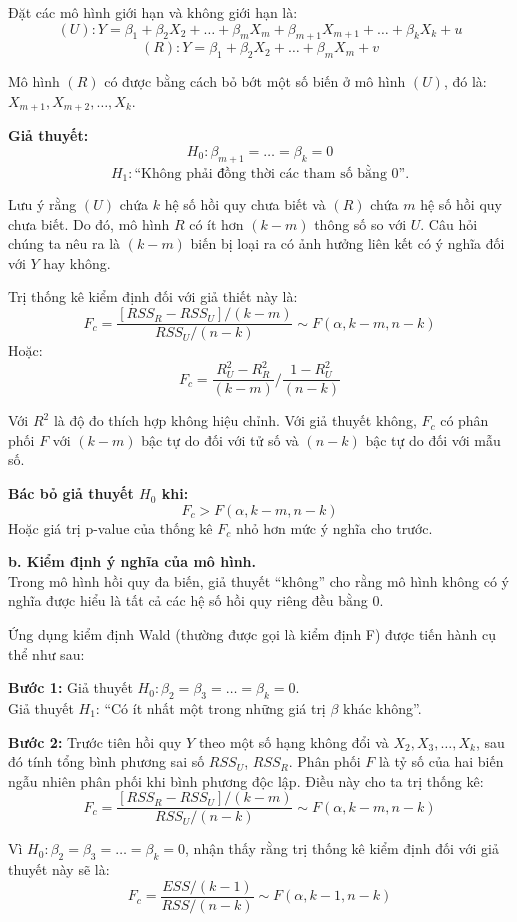 Đặt các mô hình giới hạn và không giới hạn là:
\[
(U): Y = \beta_1 + \beta_2 X_2 + \dots + \beta_m X_m + \beta_{m+1} X_{m+1} + \dots + \beta_k X_k + u
\]
\[
(R): Y = \beta_1 + \beta_2 X_2 + \dots + \beta_m X_m + v
\]

Mô hình $(R)$ có được bằng cách bỏ bớt một số biến ở mô hình $(U)$, đó là: $X_{m+1}, X_{m+2}, \dots, X_k$.

\textbf{Giả thuyết:}
\[
H_0 : \beta_{m+1} = \dots = \beta_k = 0
\]
\[
H_1 : \text{``Không phải đồng thời các tham số bằng 0''.}
\]

Lưu ý rằng $(U)$ chứa $k$ hệ số hồi quy chưa biết và $(R)$ chứa $m$ hệ số hồi quy chưa biết. Do đó, mô hình $R$ có ít hơn $(k - m)$ thông số so với $U$. Câu hỏi chúng ta nêu ra là $(k - m)$ biến bị loại ra có ảnh hưởng liên kết có ý nghĩa đối với $Y$ hay không.

Trị thống kê kiểm định đối với giả thiết này là:
\[
F_c = \frac{\left[ RSS_R - RSS_U \right]/(k-m)}{RSS_U/(n-k)} \sim F(\alpha, k-m, n-k)
\]
Hoặc:
\[
F_c = \frac{R^2_U - R^2_R}{(k-m)} \Big/ \frac{1 - R^2_U}{(n-k)}
\]

Với $R^2$ là độ đo thích hợp không hiệu chỉnh. Với giả thuyết không, $F_c$ có phân phối $F$ với $(k-m)$ bậc tự do đối với tử số và $(n-k)$ bậc tự do đối với mẫu số.

\textbf{Bác bỏ giả thuyết $H_0$ khi:}
\[
F_c > F(\alpha, k-m, n-k)
\]
Hoặc giá trị p-value của thống kê $F_c$ nhỏ hơn mức ý nghĩa cho trước.

\textbf{b. Kiểm định ý nghĩa của mô hình.}\\
Trong mô hình hồi quy đa biến, giả thuyết ``không'' cho rằng mô hình không có ý nghĩa được hiểu là tất cả các hệ số hồi quy riêng đều bằng 0.

Ứng dụng kiểm định Wald (thường được gọi là kiểm định F) được tiến hành cụ thể như sau:

\textbf{Bước 1:} Giả thuyết $H_0: \beta_2 = \beta_3 = \dots = \beta_k = 0$. \\
Giả thuyết $H_1$: ``Có ít nhất một trong những giá trị $\beta$ khác không''.

\textbf{Bước 2:} Trước tiên hồi quy $Y$ theo một số hạng không đổi và $X_2, X_3, \dots, X_k$, sau đó tính tổng bình phương sai số $RSS_U$, $RSS_R$. Phân phối $F$ là tỷ số của hai biến ngẫu nhiên phân phối khi bình phương độc lập. Điều này cho ta trị thống kê:
\[
F_c = \frac{\left[ RSS_R - RSS_U \right]/(k-m)}{RSS_U/(n-k)} \sim F(\alpha, k-m, n-k)
\]

Vì $H_0 : \beta_2 = \beta_3 = \dots = \beta_k = 0$, nhận thấy rằng trị thống kê kiểm định đối với giả thuyết này sẽ là:
\begin{equation*}
    F_c = \frac{ESS/(k-1)}{RSS/(n-k)} \sim F(\alpha, k-1, n-k)
\end{equation*}

